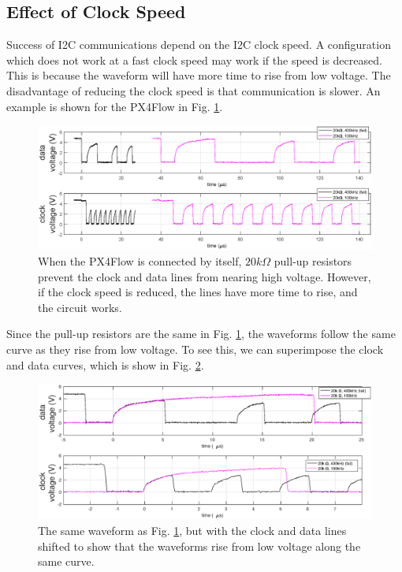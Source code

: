 \documentclass[10pt]{article}
\begin{document}
\subsection*{Effect of Clock Speed}

Success of I2C communications depend on the I2C clock speed. A configuration which does not work at a fast clock speed may work if the speed is decreased. This is because the waveform will have more time to rise from low voltage. The disadvantage of reducing the clock speed is that communication is slower. An example is shown for the PX4Flow in Fig. \ref{fig:clockSpeedShift}.
\begin{figure}[ht]
\centering
\includegraphics[width=1.0\textwidth]{5microsec/clock_shift_cropped.eps}
\caption{When the PX4Flow is connected by itself, $20 k \Omega$ pull-up resistors prevent the clock and data lines from nearing high voltage. However, if the clock speed is reduced, the lines have more time to rise, and the circuit works.}
\label{fig:clockSpeedShift}
\end{figure}
Since the pull-up resistors are the same in Fig. \ref{fig:clockSpeedShift}, the waveforms follow the same curve as they rise from low voltage. To see this, we can superimpose the clock and data curves, which is show in Fig. \ref{fig:clockSpeedCompare}.
\begin{figure}[ht]
\centering
\includegraphics[width=1.0\textwidth]{5microsec/clock_compare_zoom_cropped.eps}
\caption{The same waveform as Fig. \ref{fig:clockSpeedShift}, but with the clock and data lines shifted to show that the waveforms rise from low voltage along the same curve.}
\label{fig:clockSpeedCompare}
\end{figure}
\end{document}
